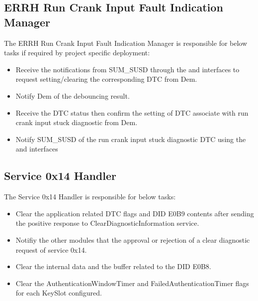 {}

\subsection{ERRH Run Crank Input Fault Indication Manager}
\label{subsec:ERRHRunCrankFAManager}
The ERRH Run Crank Input Fault Indication Manager is responsible for below tasks if required by project specific deployment:

\begin{itemize}
    \item Receive the notifications from SUM_SUSD through the  and  interfaces to request setting/clearing the corresponding DTC from Dem.
    \item Notify Dem of the debouncing result.
    \item Receive the DTC status then confirm the setting of DTC associate with run crank input stuck diagnostic from Dem.
    \item Notify SUM_SUSD of the run crank input stuck diagnostic DTC using the  and  interfaces
\end{itemize}


{       }

\subsection{Service 0x14 Handler}
\label{subsec:Service14Handler}
The Service 0x14 Handler is responsible for below tasks:

\begin{itemize}
    \item Clear the application related DTC flags and DID E0B9 contents after sending the positive response to ClearDiagnosticInformation service.
    \item Notifiy the other modules that the approval or rejection of a clear diagnostic request of service 0x14.
    \item Clear the internal data and the buffer related to the DID E0B8.
    \item Clear the AuthenticationWindowTimer and FailedAuthenticationTimer flags for each KeySlot configured.
\end{itemize}

